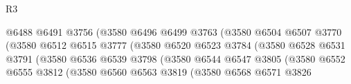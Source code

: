\begin{lexlean}{R3}
\begin{coremodule}
                                              @6488
                                              @6491
                                              @3756
                                              (@3580
                                                @6496
                                                @6499
                                                @3763
                                                (@3580
                                                  @6504
                                                  @6507
                                                  @3770
                                                  (@3580
                                                    @6512
                                                    @6515
                                                    @3777
                                                    (@3580
                                                      @6520
                                                      @6523
                                                      @3784
                                                      (@3580
                                                        @6528
                                                        @6531
                                                        @3791
                                                        (@3580
                                                          @6536
                                                          @6539
                                                          @3798
                                                          (@3580
                                                            @6544
                                                            @6547
                                                            @3805
                                                            (@3580
                                                              @6552
                                                              @6555
                                                              @3812
                                                              (@3580
                                                                @6560
                                                                @6563
                                                                @3819
                                                                (@3580
                                                                  @6568
                                                                  @6571
                                                                  @3826

\end{coremodule}
\end{lexlean}
